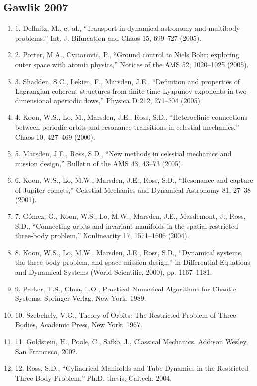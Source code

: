 \documentclass[12pt]{article}
\begin{document}
\subsection*{Gawlik 2007}
\begin{enumerate}
\item 1. Dellnitz, M., et al., ``Transport in dynamical astronomy and multibody problems,'' Int. J. Bifurcation and Chaos 15, 699--727 (2005).
\item 2. Porter, M.A., Cvitanović, P., ``Ground control to Niels Bohr: exploring outer space with atomic physics,'' Notices of the AMS 52, 1020--1025 (2005).
\item 3. Shadden, S.C., Lekien, F., Marsden, J.E., ``Definition and properties of Lagrangian coherent structures from finite-time Lyapunov exponents in two-dimensional aperiodic flows,'' Physica D 212, 271--304 (2005).
\item 4. Koon, W.S., Lo, M., Marsden, J.E., Ross, S.D., ``Heteroclinic connections between periodic orbits and resonance transitions in celestial mechanics,'' Chaos 10, 427--469 (2000).
\item 5. Marsden, J.E., Ross, S.D., ``New methods in celestial mechanics and mission design,'' Bulletin of the AMS 43, 43--73 (2005).
\item 6. Koon, W.S., Lo, M.W., Marsden, J.E., Ross, S.D., ``Resonance and capture of Jupiter comets,'' Celestial Mechanics and Dynamical Astronomy 81, 27--38 (2001).
\item 7. Gómez, G., Koon, W.S., Lo, M.W., Marsden, J.E., Masdemont, J., Ross, S.D., ``Connecting orbits and invariant manifolds in the spatial restricted three-body problem,'' Nonlinearity 17, 1571--1606 (2004).
\item 8. Koon, W.S., Lo, M.W., Marsden, J.E., Ross, S.D., ``Dynamical systems, the three-body problem, and space mission design,'' in Differential Equations and Dynamical Systems (World Scientific, 2000), pp. 1167--1181.
\item 9. Parker, T.S., Chua, L.O., Practical Numerical Algorithms for Chaotic Systems, Springer-Verlag, New York, 1989.
\item 10. Szebehely, V.G., Theory of Orbits: The Restricted Problem of Three Bodies, Academic Press, New York, 1967.
\item 11. Goldstein, H., Poole, C., Safko, J., Classical Mechanics, Addison Wesley, San Francisco, 2002.
\item 12. Ross, S.D., ``Cylindrical Manifolds and Tube Dynamics in the Restricted Three-Body Problem,'' Ph.D. thesis, Caltech, 2004.

\end{enumerate}
\end{document}
